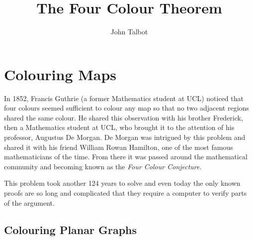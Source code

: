 \documentclass[12pt]{article}
\title{The Four Colour Theorem}
\author{John Talbot}
\begin{document}
\maketitle

\section*{Colouring Maps}
In 1852, Francis Guthrie  (a former Mathematics student at UCL) noticed that four colours seemed sufficient to colour any map so that no two adjacent regions shared the same colour. He shared this observation with his brother Frederick, then a Mathematics student at UCL, who brought it to the attention of his professor, Augustus De Morgan. De Morgan was intrigued by this problem and shared it with his friend William Rowan Hamilton, one of the most famous mathematicians of the time. From there it was passed around the mathematical community and becoming known as the \emph{Four Colour Conjecture}.

This problem took another 124 years to solve and even today the only known proofs are so long and complicated that they require a computer to verify parts of the argument.

\subsection*{Colouring Planar Graphs}
\end{document}
